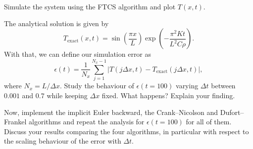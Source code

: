 \documentclass{../project}
\begin{document}
\begin{sheet}[title={Project 4: Partial differential equations (PDEs)}, number=4, due={December 20th, 10am}]
\begin{problem}[title={Diffusion}, label=diffusion]
  \begin{subproblem}[label=laplace:a,points=8]
    Simulate the system using the FTCS algorithm and plot $T(x, t)$.
  \end{subproblem}
  \begin{subproblem}[label=laplace:b,points=4]
    The analytical solution is given by
    \begin{equation}
      T_\text{exact}(x,t) = \sin\left(\frac{\pi x}{L}\right) \exp\left(-\frac{\pi^2 K t}{L^2 C \rho}\right).
    \end{equation}
    With that, we can define our simulation error as
    \begin{equation}
      \epsilon(t) = \frac{1}{N_x} \sum_{j=1}^{N_x-1}|T(j\Delta x,t) - T_\text{exact}(j\Delta x,t)|,
    \end{equation}
    where $N_x = L / \Delta x$.
    Study the behaviour of $\epsilon(t=100)$
    varying $\Delta t$ between $0.001$ and $0.7$
    while keeping $\Delta x$ fixed.
    What happens? Explain your finding.
  \end{subproblem}
  \begin{subproblem}[label=laplace:c,points=4]
    Now, implement the implicit Euler backward, the Crank--Nicolson and Dufort--Frankel algorithms
    and repeat the analysis for $\epsilon(t=100)$ for all of them.
    Discuss your results comparing the four algorithms,
    in particular with respect to the scaling behaviour
    of the error with $\Delta t$.
  \end{subproblem}

  \iffalse
  \begin{subproblem}[label=laplace:b,points=4]
    In the following, the rod initially has a homogeneous temperature of $T_0=\SI{100}{\celsius}$.
    Plot a 3D plot with the axes $x$, $t$ and $T(x, t)$.
    Discuss your solution.
  \end{subproblem}
  \fi

\end{problem}

\clearpage
\begin{problem}[title={Solitons}, label=solitons]



\end{problem}
\end{sheet}
\end{document}
